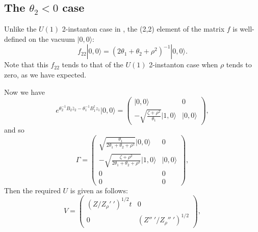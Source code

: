 \documentclass[a4paper,a4paper]{article}
\begin{document}
\subsection{The $\theta_2<0$ case}

Unlike the $U(1)$ 2-instanton case in \cite{TianZhu}, the (2,2)
element of the matrix $f$ is well-defined on the vacuum
$|0,0\rangle$:
\begin{equation}
f_{22}|0,0\rangle=(2\theta_1+\theta_2+\rho^2)^{-1}|0,0\rangle.
\end{equation}
Note that this $f_{22}$ tends to that of the $U(1)$ 2-instanton
case when $\rho$ tends to zero, as we have expected.

Now we have
\begin{equation}
e^{\theta_2^{-1}B_2\bar{z}_2-\theta_1^{-1}B_1^\dag
z_1}|0,0\rangle=\left(\begin{array}{cc} |0,0\rangle & 0 \\
-\sqrt{\frac{\zeta+\rho^2}{\theta_1}}|1,0\rangle & |0,0\rangle
\end{array}\right),
\end{equation}
and so
\begin{equation}
\Gamma=\left(\begin{array}{cc} \sqrt{\frac{\theta_1}{2\theta_1+
\theta_2+\rho^2}}|0,0\rangle & 0 \\
-\sqrt{\frac{\zeta+\rho^2}{2\theta_1+ \theta_2+\rho^2}}|1,0\rangle
& |0,0\rangle \\ 0 & 0 \\ 0 & 0
\end{array}\right),
\end{equation}
Then the required $U$ is given as follows:
\begin{equation}
V=\left(\begin{array}{cc} (Z/Z_\rho'~')^{1/2}t & 0 \\
0 & (Z''~'/Z_\rho''~')^{1/2} \end{array}\right),
\end{equation}
\end{document}
